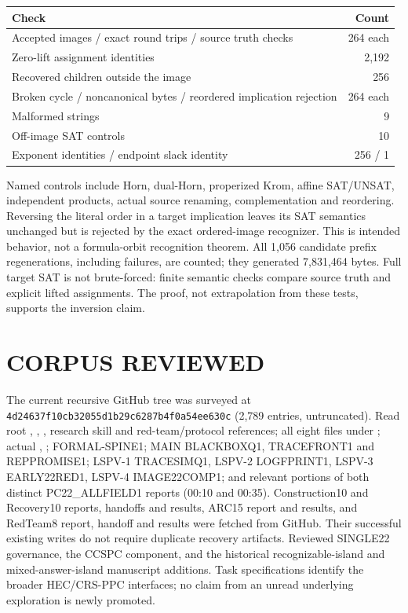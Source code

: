 \documentclass[11pt]{article}
\begin{document}
\begin{center}\begin{tabular}{lr}\toprule
Check & Count\\\midrule
Accepted images / exact round trips / source truth checks & 264 each\\
Zero-lift assignment identities & 2,192\\
Recovered children outside the image & 256\\
Broken cycle / noncanonical bytes / reordered implication rejection & 264 each\\
Malformed strings & 9\\
Off-image SAT controls & 10\\
Exponent identities / endpoint slack identity & 256 / 1\\\bottomrule
\end{tabular}\end{center}
Named controls include Horn, dual-Horn, properized Krom, affine SAT/UNSAT,
independent products, actual source renaming, complementation and reordering.
Reversing the literal order in a target implication leaves its SAT semantics
unchanged but is rejected by the exact ordered-image recognizer. This is
intended behavior, not a formula-orbit recognition theorem.
All 1,056 candidate prefix regenerations, including failures, are counted;
they generated 7,831,464 bytes. Full target SAT is not brute-forced: finite
semantic checks compare source truth and explicit lifted assignments. The
proof, not extrapolation from these tests, supports the inversion claim.

\section{CORPUS REVIEWED}
The current recursive GitHub tree was surveyed at
\texttt{4d24637f10cb32055d1b29c6287b4f0a54ee630c} (2,789 entries, untruncated).
Read root , , , research skill
and red-team/protocol references; all eight files under ; actual
, ; FORMAL-SPINE1; MAIN BLACKBOXQ1,
TRACEFRONT1 and REPPROMISE1; LSPV-1 TRACESIMQ1, LSPV-2 LOGFPRINT1,
LSPV-3 EARLY22RED1, LSPV-4 IMAGE22COMP1; and relevant portions of both
distinct PC22\_ALLFIELD1 reports (00:10 and 00:35).
Construction10 and Recovery10 reports, handoffs and results, ARC15 report and
results, and RedTeam8 report, handoff and results were fetched from GitHub.
Their successful existing writes do not require duplicate recovery artifacts.
Reviewed SINGLE22 governance, the CCSPC component, and the historical
recognizable-island and mixed-answer-island manuscript additions. Task
specifications identify the broader HEC/CRS-PPC interfaces; no claim from an
unread underlying exploration is newly promoted.
\end{document}
